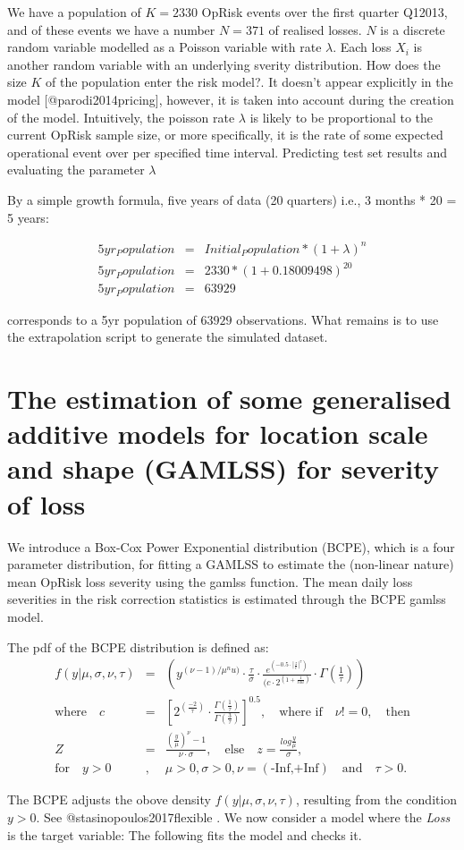 \documentclass[]{article}
\begin{document}
We have a population of \(K = 2330\) OpRisk events over the first
quarter Q12013, and of these events we have a number \(N = 371\) of
realised losses. \(N\) is a discrete random variable modelled as a
Poisson variable with rate \(\lambda\). Each loss \(X_i\) is another
random variable with an underlying sverity distribution. How does the
size \(K\) of the population enter the risk model?. It doesn't appear
explicitly in the model {[}@parodi2014pricing{]}, however, it is taken
into account during the creation of the model. Intuitively, the poisson
rate \(\lambda\) is likely to be proportional to the current OpRisk
sample size, or more specifically, it is the rate of some expected
operational event over per specified time interval. Predicting test set
results and evaluating the parameter \(\lambda\)

By a simple growth formula, five years of data (20 quarters) i.e., 3
months * 20 = 5 years:

\singlespacing

\begin{eqnarray}
5yr_Population &=& Initial_Population * (1 + \lambda)^n \nonumber \\
5yr_Population &=& 2330*(1+0.18009498)^20 \nonumber \\
5yr_Population &=& 63929
\end{eqnarray} \doublespacing

corresponds to a 5yr population of \(63929\) observations. What remains
is to use the extrapolation script to generate the simulated dataset.

\section{The estimation of some  generalised additive models for location scale and shape (GAMLSS) for severity of loss}
\label{sec:The estimation of some  generalised additive models for location scale and shape (GAMLSS) for severity of loss}

We introduce a Box-Cox Power Exponential distribution (BCPE), which is a
four parameter distribution, for fitting a GAMLSS to estimate the
(non-linear nature) mean OpRisk loss severity using the gamlss function.
The mean daily loss severities in the risk correction statistics is
estimated through the BCPE gamlss model.\medskip

The pdf of the BCPE distribution is defined as: \singlespacing
\begin{eqnarray}
f(y|\mu,\sigma,\nu,\tau)&=&(y^{(\nu-1)/\mu^nu)}\cdot{\frac{\tau}{\sigma}}\cdot \frac{e^(-0.5\cdot|\frac{z}{c}|^\tau)}{(c\cdot 2^(1+\frac{1}{tau})}\cdot \Gamma(\frac{1}{\tau}))\nonumber\\
\mbox{where} \quad c&=&[2^(\frac{-2}{\tau})\cdot\frac{\Gamma(\frac{1}{\tau})}{\Gamma(\frac{3}{\tau})}]^{0.5},\quad \mbox{where if}\quad \nu!=0, \quad \mbox{then} \nonumber\\
Z&=&\frac{(\frac{y}{\mu})^\nu-1}{\nu\cdot \sigma},\quad \mbox{else} \quad z=\frac{log\frac{y}{\mu}}{\sigma},\nonumber\\
\mbox{for} \quad y>0 &,& \mu>0, \sigma>0, \nu=(\mbox{-Inf,+Inf})\quad \mbox{and}\quad \tau>0.
\end{eqnarray} \doublespacing

The BCPE adjusts the obove density \(f(y|\mu,\sigma,\nu,\tau)\),
resulting from the condition \(y>0\). See @stasinopoulos2017flexible .
We now consider a model where the \emph{Loss} is the target variable:
The following fits the model and checks it.\medskip

\singlespacing
\end{document}
